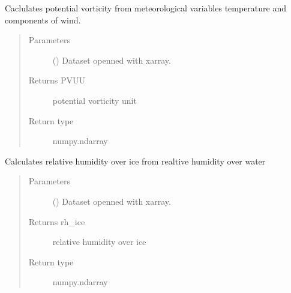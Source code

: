 \documentclass[a4paper,11pt,english]{sphinxmanual}
\begin{document}
\begin{fulllineitems}
\label{\detokenize{modules:envlib.calc_altrv_vars.get_pvu}}
Caclulates potential vorticity from meteorological variables temperature and components of wind.
\begin{quote}\begin{description}
\item[{Parameters}] \leavevmode
{} () \textendash{} Dataset openned with xarray.

\item[{Returns PVUU}] \leavevmode
potential vorticity unit

\item[{Return type}] \leavevmode
numpy.ndarray

\end{description}\end{quote}

\end{fulllineitems}


\begin{fulllineitems}
\label{\detokenize{modules:envlib.calc_altrv_vars.get_rh_ice}}
Calculates relative humidity over ice from realtive humidity over water
\begin{quote}\begin{description}
\item[{Parameters}] \leavevmode
{} () \textendash{} Dataset openned with xarray.

\item[{Returns rh\_ice}] \leavevmode
relative humidity over ice

\item[{Return type}] \leavevmode
numpy.ndarray

\end{description}\end{quote}

\end{fulllineitems}
\end{document}
